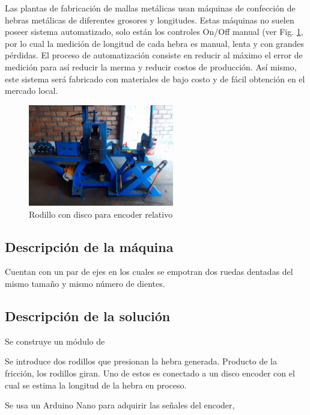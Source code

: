 \documentclass[main_conf.tex]{subfiles}
\begin{document}
Las plantas de fabricación de mallas metálicas usan máquinas de
confección de hebras metálicas de diferentes grosores y
longitudes. Estas máquinas no suelen poseer sistema
automatizado, solo están los controles On/Off manual (ver Fig.
\ref{maquina_a_automatizar}, por lo cual la medición de longitud
de cada hebra es manual, lenta y con grandes pérdidas. El proceso
de automatización consiste en reducir al máximo el error de medición
para así reducir la merma y reducir costos de producción. Así mismo,
este sistema será fabricado con materiales de bajo costo y de fácil
obtención en el mercado local.

\begin{figure}[h]
  \centering
  \includegraphics[width=2.5in]{../img/distancia_inicial.png}
  \caption{Rodillo con disco para encoder relativo}
  \label{maquina_a_automatizar}
\end{figure}

\subsection{Descripción de la máquina}
Cuentan con un par de ejes en los cuales se empotran dos ruedas dentadas
del mismo tamaño y mismo número de dientes.

\subsection{Descripción de la solución}
Se construye un módulo de

Se introduce dos rodillos que presionan la hebra generada. Producto de
la fricción, los rodillos giran. Uno de estos es conectado a un disco
encoder con el cual se estima la longitud de la hebra en proceso.

Se usa un Arduino Nano para adquirir las señales del encoder,
\end{document}
